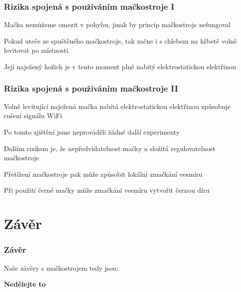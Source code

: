 \documentclass{beamer}
\newcommand{\mypause}{}
\begin{document}
\begin{frame}
\frametitle{Rizika spojená s používáním mačkostroje I}
    Mačka nemůžeme omezit v pohybu, jinak by princip mačkostroje nefungoval
    \mypause \\ \vspace*{5pt}

    Pokud uteče ze spuštěného mačkostroje, tak začne i s chlebem na hřbetě volně levitovat po místnosti
    \mypause \\ \vspace*{5pt}

    Její naježený kožich je v tento moment plně nabitý elektrostatickou elektřinou 
    \mypause \\ \vspace*{5pt}
\end{frame}

\begin{frame}
\frametitle{Rizika spojená s používáním mačkostroje II}
    Volně levitující naježená mačka nabitá elektrostatickou elektřinou způsobuje rušení signálu WiFi
    \mypause \\ \vspace*{5pt}
    
    Po tomto zjištění jsme neprováděli žádné další experimenty
    \mypause \\ \vspace*{5pt}
    
    Dalším rizikem je, že nepředvidatelnost mačky a složitá regulovatelnost mačkostroje
    \mypause \\ \vspace*{5pt}
    
    Přetížení mačkostroje pak může způsobit lokální zmačkání vesmíru
    \mypause \\ \vspace*{5pt}

    Při použití černé mačky může zmačkání vesmíru vytvořit černou díru
\end{frame}

\section{Závěr}
\begin{frame}
    \frametitle{Závěr}
    Naše závěry s mačkostrojem tedy jsou:
    \mypause \\ \vspace*{20pt}
    
    \Huge{\centerline{\textbf{Nedělejte to}}}
\end{frame}
\end{document}
